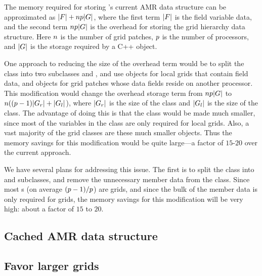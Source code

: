 \documentclass{article}
\begin{document}
The memory required for storing \enzo's current AMR
data structure can be approximated as $|F| + n p
|G|$, where the first term $|F|$ is the field
variable data, and the second term $n p |G|$ is
the overhead for storing the grid hierarchy data structure.  Here
$n$ is the number of grid patches, $p$
is the number of processors, and $|G|$ is the storage required
by a C++  object.

One approach to reducing the size of the overhead term would be
to split the  class into two subclasses 
and , and use   objects for local grids
that contain field data, and  objects for grid
patches whose data fields reside on another processor.
This modification would change the overhead storage term from
$n p |G|$ to $n ((p-1)
|G_r| + |G_l|$), where $|G_r|$ is the
size of the  class and $|G_l|$ is the size
of the  class.  The advantage of doing this is that the
 class would be made much smaller, since most of
the variables in the  class are only required for local
grids.  Also, a vast majority of the grid classes are these much
smaller  objects.  Thus the memory savings for this
modification would be quite large---a factor of $15$-$20$ over the
current approach.

 We have several plans for addressing this issue.  The first is to
 split the  class into  and
  subclasses, and remove the unnecessary member
 data from the  class.  Since most s (on
 average $(p-1)/p$) are  grids, and
 since the bulk of the member data is only required for
  grids, the memory savings for this modification
 will be very high: about a factor of $15$ to $20$.

\subsection{Cached AMR data structure}  \label{solution:amr-cache}
\subsection{Favor larger grids}\label{solution:amr-large-grids}
\end{document}
